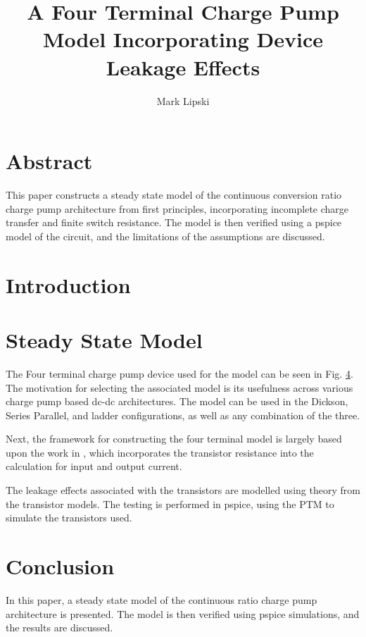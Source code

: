 \documentclass[conference]{IEEEtran}
\title{A Four Terminal Charge Pump Model Incorporating Device Leakage Effects}
\author{Mark Lipski}
\begin{document}
	\maketitle
	\section{Abstract}
	This paper constructs a steady state model of the continuous conversion ratio charge pump architecture from first principles, incorporating incomplete charge transfer and finite switch resistance. The model is then verified using a pspice model of the circuit, and the limitations of the assumptions are discussed.
	\section{Introduction}
	
	
	\section{Steady State Model}
	The Four terminal charge pump device used for the model can be seen in Fig. \ref{}. The motivation for selecting the associated model is its usefulness across various charge pump based dc-dc architectures. The model can be used in the Dickson, Series Parallel, and ladder configurations, as well as any combination of the three. 
	
	Next, the framework for constructing the four terminal model is largely based upon the work in \cite{}, which incorporates the transistor resistance into the calculation for input and output current. 
	
	The leakage effects associated with the transistors are modelled using theory from the \cite{} transistor models. The testing is performed in pspice, using the PTM to simulate the transistors used. 
	
	
 	
 	\section{Conclusion}
 	In this paper, a steady state model of the continuous ratio charge pump architecture is presented. The model is then verified using pspice simulations, and the results are discussed.
 	
\end{document}
